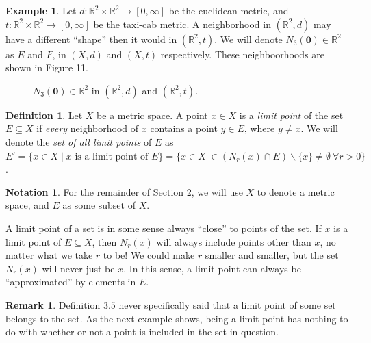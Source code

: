 \documentclass{article}
\newcommand{\R}{\mathbb{R}}
\theoremstyle{definition}
\newtheorem{definition}{Definition}[section]
\newtheorem{note}{Notation}
\newtheorem{example}{Example}[section]
\newtheorem{remark}{Remark}[section]
\begin{document}
\begin{example}
Let $ d:\R^2\times\R^2\to[0,\infty] $ be the euclidean metric, and $ t:\R^2\times\R^2\to[0,\infty] $ be the taxi-cab metric. A neighborhood in $ (\R^2,d) $ may have a different ``shape'' then it would in $ (\R^2,t) $. We will denote $ N_{3}(\mathbf{0})\in \R^2 $ as $ E $ and $ F $, in $ (X,d) $ and $ (X,t) $ respectively. These neighboorhoods are shown in Figure 11.     
	\begin{figure}[h!]
	\centering
	\caption{$ N_{3}(\mathbf{0})\in \R^2 $ in $ (\R^2,d) $ and $ (\R^2,t) $. }
\end{figure}	
\end{example}
\begin{definition}
	Let $ X $ be a metric space. A point $ x\in X $ is a \textit{\color{red}limit point} of the set $ E\subseteq X $ if \textit{every} neighborhood of $ x $ contains a point $ y\in E $, where $ y\neq x $. We will denote the \textit{\color{red} set of all limit points} of $ E $ as $ E'=\{x\in X\mid x\text{ is a limit point of }E \}=\{x\in X\mid \in (N_r(x)\cap E)\backslash\{x\}\neq\emptyset\ \forall r>0\} $.
\end{definition}
\begin{note}
	For the remainder of Section 2, we will use $ X $ to denote a metric space, and $ E $ as some subset of $ X $. 
\end{note}
A limit point of a set is in some sense always ``close'' to points of the set. If $ x $ is a limit point of $ E\subseteq X $, then $ N_r(x) $ will always include points other than $ x $, no matter what we take $ r $ to be! We could make $ r $ smaller and smaller, but the set $ N_r(x) $ will never just be $ x $. In this sense, a limit point can always be ``approximated'' by elements in $ E $.  
\begin{remark}
Definition $ 3.5 $ never specifically said that a limit point of some set belongs to the set. As the next example shows, being a limit point has nothing to do with whether or not a point is included in the set in question. 	
\end{remark}
\end{document}
